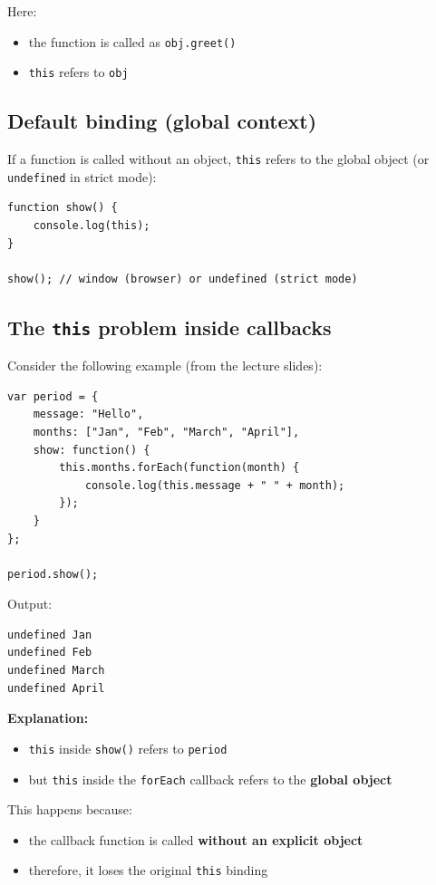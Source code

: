\documentclass{scrbook}
\begin{document}
Here:
\begin{itemize}
    \item the function is called as \texttt{obj.greet()}
    \item \texttt{this} refers to \texttt{obj}
\end{itemize}

\subsection{Default binding (global context)}

If a function is called without an object, \texttt{this} refers to the global object (or \texttt{undefined} in strict mode):

\begin{lstlisting}
function show() {
    console.log(this);
}

show(); // window (browser) or undefined (strict mode)
\end{lstlisting}

\subsection{The \texttt{this} problem inside callbacks}

Consider the following example (from the lecture slides):

\begin{lstlisting}
var period = {
    message: "Hello",
    months: ["Jan", "Feb", "March", "April"],
    show: function() {
        this.months.forEach(function(month) {
            console.log(this.message + " " + month);
        });
    }
};

period.show();
\end{lstlisting}

Output:
\begin{lstlisting}
undefined Jan
undefined Feb
undefined March
undefined April
\end{lstlisting}

\textbf{Explanation:}
\begin{itemize}
    \item \texttt{this} inside \texttt{show()} refers to \texttt{period}
    \item but \texttt{this} inside the \texttt{forEach} callback refers to the \textbf{global object}
\end{itemize}

This happens because:
\begin{itemize}
    \item the callback function is called \textbf{without an explicit object}
    \item therefore, it loses the original \texttt{this} binding
\end{itemize}
\end{document}
